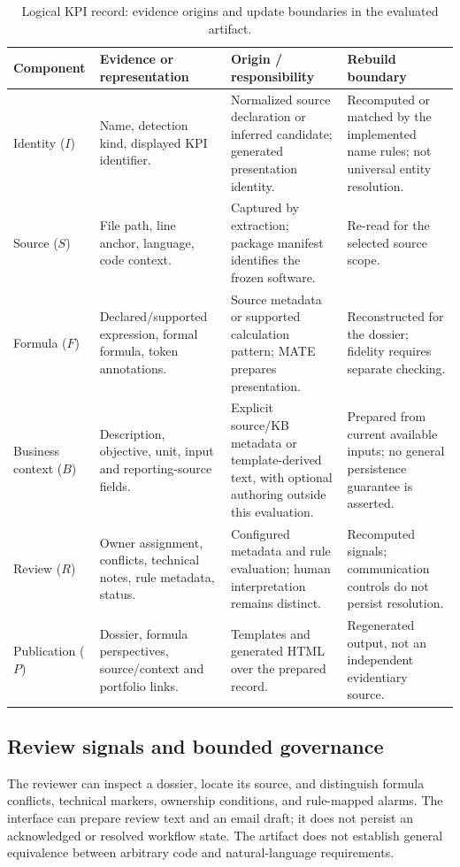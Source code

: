 \documentclass[a4paper,fleqn]{cas-dc}
\begin{document}
\begin{table}[!t]
\centering
\caption{Logical KPI record: evidence origins and update boundaries in the evaluated artifact.}
\label{tab:record}
\begin{tabularx}{\textwidth}{p{}p{}XX}
\toprule
\textbf{Component} & \textbf{Evidence or representation} & \textbf{Origin / responsibility} & \textbf{Rebuild boundary} \\
\midrule
Identity ($I$) & Name, detection kind, displayed KPI identifier. & Normalized source declaration or inferred candidate; generated presentation identity. & Recomputed or matched by the implemented name rules; not universal entity resolution. \\
Source ($S$) & File path, line anchor, language, code context. & Captured by extraction; package manifest identifies the frozen software. & Re-read for the selected source scope. \\
Formula ($F$) & Declared/supported expression, formal formula, token annotations. & Source metadata or supported calculation pattern; MATE prepares presentation. & Reconstructed for the dossier; fidelity requires separate checking. \\
Business context ($B$) & Description, objective, unit, input and reporting-source fields. & Explicit source/KB metadata or template-derived text, with optional authoring outside this evaluation. & Prepared from current available inputs; no general persistence guarantee is asserted. \\
Review ($R$) & Owner assignment, conflicts, technical notes, rule metadata, status. & Configured metadata and rule evaluation; human interpretation remains distinct. & Recomputed signals; communication controls do not persist resolution. \\
Publication ($P$) & Dossier, formula perspectives, source/context and portfolio links. & Templates and generated HTML over the prepared record. & Regenerated output, not an independent evidentiary source. \\
\bottomrule
\end{tabularx}
\end{table}

\subsection{Review signals and bounded governance}
\label{sec:technical-review-workflow}

The reviewer can inspect a dossier, locate its source, and distinguish formula conflicts, technical markers, ownership conditions, and rule-mapped alarms. The interface can prepare review text and an email draft; it does not persist an acknowledged or resolved workflow state. The artifact does not establish general equivalence between arbitrary code and natural-language requirements.
\end{document}
